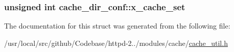 \subsubsection[{\texorpdfstring{x\+\_\+cache\+\_\+set}{x_cache_set}}]{\setlength{\rightskip}{0pt plus 5cm}unsigned {\bf int} cache\+\_\+dir\+\_\+conf\+::x\+\_\+cache\+\_\+set}\hypertarget{structcache__dir__conf_af9b5b3bb89a64fa8f7d8388388873e44}{}\label{structcache__dir__conf_af9b5b3bb89a64fa8f7d8388388873e44}


The documentation for this struct was generated from the following file\+:\begin{DoxyCompactItemize}
\item 
/usr/local/src/github/\+Codebase/httpd-\/2../modules/cache/\hyperlink{cache__util_8h}{cache\+\_\+util.\+h}\end{DoxyCompactItemize}
